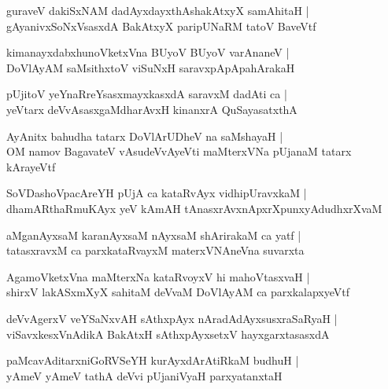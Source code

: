 \documentclass[twoside,12pt,openright]{book}
\newcounter{shloka}[chapter]
\begin{document}
\begin{shloka}%
guraveV dakiSxNAM dadAyxdayxthAshakAtxyX samAhitaH |\\
gAyanivxSoNxVsasxdA BakAtxyX paripUNaRM tatoV BaveVtf 
\end{shloka}

\begin{shloka}%
kimanayxdabxhunoVketxVna BUyoV BUyoV varAnaneV |\\
DoVlAyAM saMsithxtoV viSuNxH saravxpApApahArakaH 
\end{shloka}

\begin{shloka}%
pUjitoV yeYnaRreYsasxmayxkasxdA saravxM dadAti ca |\\
yeVtarx deVvAsasxgaMdharAvxH kinanxrA QuSayasatxthA 
\end{shloka}

\begin{shloka}%
AyAnitx bahudha tatarx DoVlArUDheV na saMshayaH |\\
OM namov BagavateV vAsudeVvAyeVti maMterxVNa pUjanaM tatarx kArayeVtf
\end{shloka}

\begin{shloka}%
SoVDashoVpacAreYH pUjA ca kataRvAyx vidhipUravxkaM |\\
dhamARthaRmuKAyx yeV kAmAH tAnasxrAvxnApxrXpunxyAdudhxrXvaM 
\end{shloka}

\begin{shloka}%
aMganAyxsaM karanAyxsaM nAyxsaM shArirakaM ca yatf |\\
tatasxravxM ca parxkataRvayxM materxVNAneVna suvarxta
\end{shloka}

\begin{shloka}%
AgamoVketxVna maMterxNa kataRvoyxV hi mahoVtasxvaH |\\
shirxV lakASxmXyX sahitaM deVvaM DoVlAyAM ca parxkalapxyeVtf 
\end{shloka}

\begin{shloka}%
deVvAgerxV veYSaNxvAH sAthxpAyx nAradAdAyxsusxraSaRyaH |\\
viSavxkesxVnAdikA BakAtxH sAthxpAyxsetxV hayxgarxtasasxdA 
\end{shloka}

\begin{shloka}%
paMcavAditarxniGoRVSeYH kurAyxdArAtiRkaM budhuH |\\
yAmeV yAmeV tathA deVvi pUjaniVyaH parxyatanxtaH 
\end{shloka}
\end{document}
